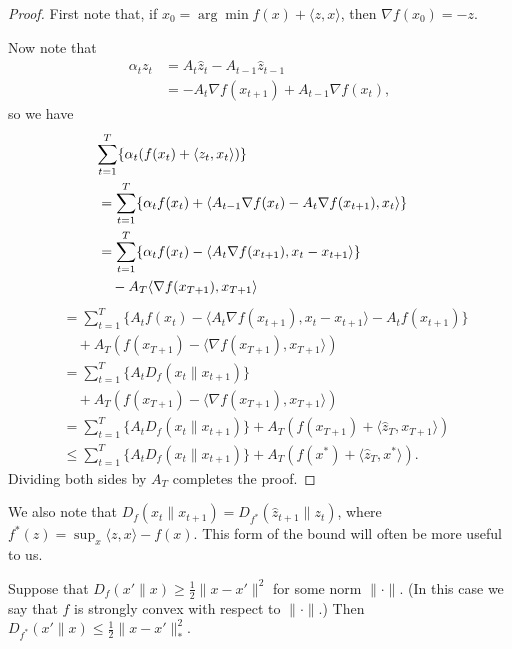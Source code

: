 \documentclass[paper.tex]{subfiles}
\begin{document}
\begin{proof}
First note that, if $x_0 = \arg\min f(x) + \langle z, x \rangle$, 
then $\nabla f(x_0) = -z$.


Now note that
\begin{align}
\alpha_{t}z_{t} 
&= A_{t}\hat z_{t} - A_{t-1}\hat z_{t-1} \\
&= - A_{t}\nabla f(x_{t+1}) + A_{t-1} \nabla f(x_{t}),
\end{align}
so we have
\begin{align}
\lefteqn{\sum_{t=1}^T \{\alpha_t(f(x_t) + \langle z_t, x_t \rangle)\}} \\
 &= \sum_{t=1}^T \{\alpha_t f(x_t) + \langle A_{t-1} \nabla f(x_t) - A_t \nabla f(x_{t+1}), x_t \rangle\} \\
 &= \sum_{t=1}^T \{\alpha_t f(x_t) - \langle A_{t} \nabla f(x_{t+1}), x_t-x_{t+1} \rangle\} \\
 & \quad - A_{T}\langle \nabla f(x_{T+1}), x_{T+1} \rangle
\end{align}
\begin{align}
 &= \sum_{t=1}^T \{A_t f(x_t) - \langle A_{t} \nabla f(x_{t+1}), x_t-x_{t+1} \rangle - A_t f(x_{t+1})\}  \\
 &\quad+ A_T(f(x_{T+1}) - \langle \nabla f(x_{T+1}), x_{T+1} \rangle) \nonumber \\
 &= \sum_{t=1}^T \{A_tD_f(x_t \| x_{t+1})\}  \\
 &\quad+ A_T(f(x_{T+1}) - \langle \nabla f(x_{T+1}), x_{T+1} \rangle) \nonumber \\
 &= \sum_{t=1}^T \{A_tD_f(x_t \| x_{t+1})\} + A_T(f(x_{T+1}) + \langle \hat{z}_T, x_{T+1} \rangle) \\
 &\leq \sum_{t=1}^T \{A_tD_f(x_t \| x_{t+1})\} + A_T(f(x^*) + \langle \hat{z}_T, x^* \rangle). 
\end{align}
Dividing both sides by $A_T$ completes the proof.
\end{proof}

We also note that $D_f(x_t \| x_{t+1}) = D_{f^*}(\hat{z}_{t+1} \| z_t)$, where $f^*(z) = \sup_x \langle z,x\rangle - f(x)$. 
This form of the bound will often be more useful to us.
\begin{lemma}
\label{lem:convexity}
Suppose that $D_f(x' \| x) \geq \frac{1}{2}\|x-x'\|^2$ for some 
norm $\|\cdot\|$. (In this case we say that $f$ is strongly 
convex with respect to $\|\cdot\|$.) 
Then $D_{f^*}(x' \| x) \leq \frac{1}{2}\|x-x'\|_{*}^2$.
\end{lemma}
\end{document}
